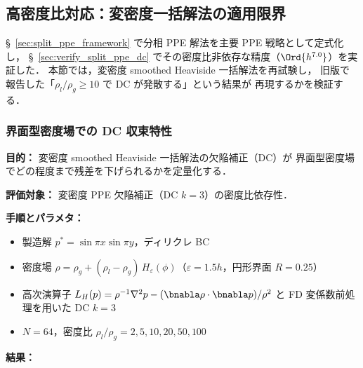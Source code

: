 %
\subsection{高密度比対応：変密度一括解法の適用限界}
\label{sec:interface_crossing}

§~\ref{sec:split_ppe_framework} で分相 PPE 解法を主要 PPE 戦略として定式化し，
§~\ref{sec:verify_split_ppe_dc} でその密度比非依存な精度（$\Ord{h^{7.0}}$）を実証した．
本節では，変密度 smoothed Heaviside 一括解法を再試験し，
旧版で報告した「$\rho_l/\rho_g \geq 10$ で DC が発散する」という結果が
再現するかを検証する．

\subsubsection{界面型密度場での DC 収束特性}
\label{sec:varrho_dc_convergence}

\noindent\textbf{目的：}
変密度 smoothed Heaviside 一括解法の欠陥補正（DC）が
界面型密度場でどの程度まで残差を下げられるかを定量化する．

\noindent\textbf{評価対象：}
変密度 PPE 欠陥補正（DC $k = 3$）の密度比依存性．

\noindent\textbf{手順とパラメタ：}
\begin{itemize}[noitemsep]
  \item 製造解 $p^* = \sin\pi x\sin\pi y$，ディリクレ BC
  \item 密度場 $\rho = \rho_g + (\rho_l - \rho_g)\,H_\varepsilon(\phi)$（$\varepsilon = 1.5h$，円形界面 $R = 0.25$）
  \item 高次演算子
        $L_H(p) = \rho^{-1}\nabla^2 p - (\bnabla\rho\cdot\bnabla p)/\rho^2$
        と FD 変係数前処理を用いた DC $k = 3$
  \item $N = 64$，密度比 $\rho_l/\rho_g = 2, 5, 10, 20, 50, 100$
\end{itemize}

\noindent\textbf{結果：}

